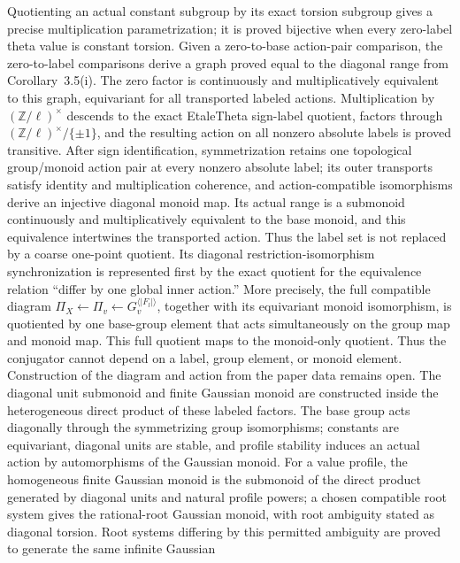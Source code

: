 \begin{definition}
  Quotienting an actual constant subgroup by its exact torsion
  subgroup gives a precise multiplication parametrization; it is proved
  bijective when every zero-label theta value is constant torsion.  Given a
  zero-to-base action-pair comparison, the zero-to-label comparisons derive a
  graph proved equal to the diagonal range from Corollary~3.5(i).  The zero
  factor is continuously and multiplicatively equivalent to this graph,
  equivariant for all transported labeled actions.
  Multiplication by \((\mathbb Z/\ell)^\times\) descends to
  the exact EtaleTheta sign-label quotient, factors through
  \((\mathbb Z/\ell)^\times/\{\pm1\}\), and the resulting action on all
  nonzero absolute labels is proved transitive.  After sign identification,
  symmetrization retains one
  topological group/monoid action pair at every nonzero absolute label;
  its outer transports satisfy identity and multiplication coherence, and
  action-compatible isomorphisms derive an injective diagonal monoid map.  Its
  actual range is a submonoid continuously and multiplicatively equivalent to
  the base monoid, and this equivalence intertwines the transported action.
  Thus the label set is not replaced by a coarse one-point quotient.  Its diagonal
  restriction-isomorphism synchronization is represented first by the exact
  quotient for the equivalence relation ``differ by one global inner action.''
  More precisely, the full compatible diagram
  \(\Pi_X\leftarrow\Pi_v\leftarrow G_v^{\langle|F_l|\rangle}\), together with
  its equivariant monoid isomorphism, is quotiented by one base-group element
  that acts simultaneously on the group map and monoid map.  This full
  quotient maps to the monoid-only quotient.  Thus the conjugator cannot
  depend on a label, group element, or monoid element.  Construction of the
  diagram and action from the paper data remains open.  The diagonal
  unit submonoid and finite Gaussian monoid are constructed inside the
  heterogeneous direct product of these labeled factors.  The base group acts
  diagonally through the symmetrizing group isomorphisms; constants are
  equivariant, diagonal units are stable, and profile stability induces an
  actual action by automorphisms of the Gaussian monoid.  For a value
  profile, the homogeneous finite Gaussian monoid is the submonoid of
  the direct product generated by diagonal units and natural profile powers;
  a chosen compatible root system gives the rational-root Gaussian monoid,
  with root ambiguity stated as diagonal torsion.  Root systems differing by
  this permitted ambiguity are proved to generate the same infinite Gaussian

\end{definition}
